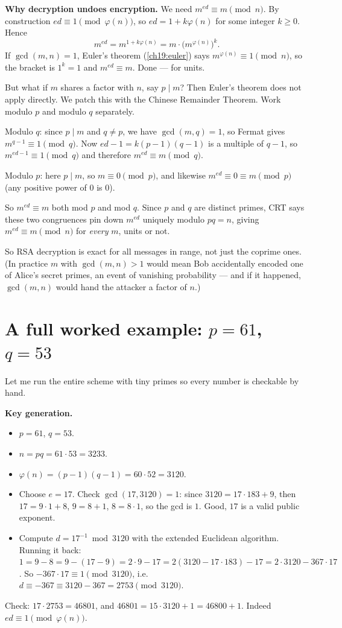 \begin{whybox}
\textbf{Why decryption undoes encryption.} We need $m^{ed}\equiv m\pmod n$. By construction $ed \equiv 1\pmod{\varphi(n)}$, so $ed = 1 + k\varphi(n)$ for some integer $k\ge 0$. Hence
\[
  m^{ed} = m^{1+k\varphi(n)} = m\cdot\bigl(m^{\varphi(n)}\bigr)^{k}.
\]
If $\gcd(m,n)=1$, Euler's theorem (\ref{ch19:euler}) says $m^{\varphi(n)}\equiv 1\pmod n$, so the bracket is $1^k=1$ and $m^{ed}\equiv m$. Done --- for units.

But what if $m$ shares a factor with $n$, say $p \mid m$? Then Euler's theorem does not apply directly. We patch this with the Chinese Remainder Theorem. Work modulo $p$ and modulo $q$ separately.

Modulo $q$: since $p\mid m$ and $q\ne p$, we have $\gcd(m,q)=1$, so Fermat gives $m^{q-1}\equiv 1\pmod q$. Now $ed-1 = k(p-1)(q-1)$ is a multiple of $q-1$, so $m^{ed-1}\equiv 1\pmod q$ and therefore $m^{ed}\equiv m\pmod q$.

Modulo $p$: here $p\mid m$, so $m\equiv 0\pmod p$, and likewise $m^{ed}\equiv 0\equiv m\pmod p$ (any positive power of $0$ is $0$).

So $m^{ed}\equiv m$ both mod $p$ and mod $q$. Since $p$ and $q$ are distinct primes, CRT says these two congruences pin down $m^{ed}$ uniquely modulo $pq=n$, giving $m^{ed}\equiv m\pmod n$ for \emph{every} $m$, units or not.
\end{whybox}

So RSA decryption is exact for all messages in range, not just the coprime ones. (In practice $m$ with $\gcd(m,n)>1$ would mean Bob accidentally encoded one of Alice's secret primes, an event of vanishing probability --- and if it happened, $\gcd(m,n)$ would hand the attacker a factor of $n$.)

\section{A full worked example: $p=61$, $q=53$}
\label{ch19:worked}

Let me run the entire scheme with tiny primes so every number is checkable by hand.

\textbf{Key generation.}
\begin{itemize}
  \item $p = 61$, $q = 53$.
  \item $n = pq = 61\cdot 53 = 3233$.
  \item $\varphi(n) = (p-1)(q-1) = 60\cdot 52 = 3120$.
  \item Choose $e = 17$. Check $\gcd(17,3120)=1$: since $3120 = 17\cdot 183 + 9$, then $17 = 9\cdot 1 + 8$, $9 = 8+1$, $8 = 8\cdot 1$, so the gcd is $1$. Good, $17$ is a valid public exponent.
  \item Compute $d = 17^{-1}\bmod 3120$ with the extended Euclidean algorithm. Running it back: $1 = 9-8 = 9-(17-9) = 2\cdot 9 - 17 = 2(3120-17\cdot 183) - 17 = 2\cdot 3120 - 367\cdot 17$. So $-367\cdot 17 \equiv 1\pmod{3120}$, i.e. $d \equiv -367 \equiv 3120-367 = 2753\pmod{3120}$.
\end{itemize}
Check: $17\cdot 2753 = 46801$, and $46801 = 15\cdot 3120 + 1 = 46800+1$. Indeed $ed\equiv 1\pmod{\varphi(n)}$.

